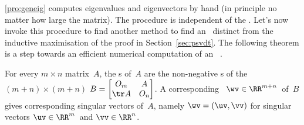 \autoref{pro:geneig} computes eigenvalues and eigenvectors by hand (in principle no matter how large the matrix). 
The procedure is independent of the \svd.
Let's now invoke this procedure to find another method to find an \svd\ distinct from the inductive maximisation of the proof in Section~\ref{sec:psvdt}. 
The following theorem is a step towards an efficient numerical computation of an \svd\ \cite[p.234]{Trefethen1997}.



\begin{theorem} \label{thm:eigsvd}
For every \(m\times n\) matrix~\(A\), the s of~\(A\) are the non-negative s of the \((m+n)\times(m+n)\)  \(B=\begin{bmatrix} O_m&A\\\tr A&O_n \end{bmatrix}\). 
A corresponding ~\(\wv\in\RR^{m+n}\)\ of~\(B\) gives corresponding  singular vectors of~\(A\), namely \(\wv=(\uv,\vv)\) for singular vectors \(\uv\in\RR^m\)\ and \(\vv\in\RR^n\). 
\end{theorem}

